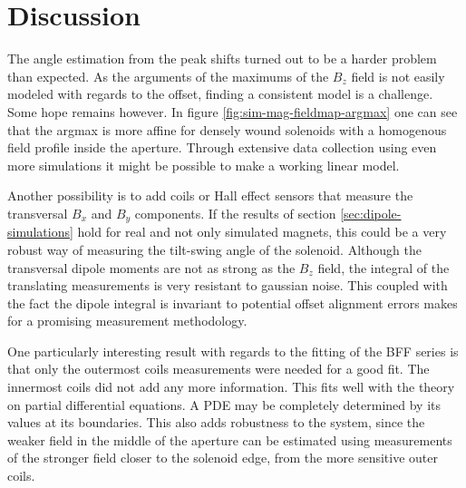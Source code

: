 \chapter{Discussion}
The angle estimation from the peak shifts turned out to be 
a harder problem than expected. As the arguments of the maximums of the
$B_z$ field is not easily modeled with regards to the offset, finding
a consistent model is a challenge. Some hope remains however. In figure
\ref{fig:sim-mag-fieldmap-argmax} one can see that the argmax is more affine
for densely wound solenoids with a homogenous field profile inside the aperture.
Through extensive data collection using even more simulations it might be
possible to make a working linear model.

Another possibility is to add coils or Hall effect sensors that measure
the transversal $B_x$ and $B_y$ components. If the results of section 
\ref{sec:dipole-simulations} hold for real and not only simulated magnets,
this could be a very robust way of measuring the tilt-swing angle of the
solenoid. Although the transversal dipole moments are not as strong as
the $B_z$ field, the integral of the translating measurements is very
resistant to gaussian noise. This coupled with the fact the dipole
integral is invariant to potential offset alignment errors makes for
a promising measurement methodology.

One particularly interesting result with regards to the fitting
of the BFF series is that only the outermost coils measurements
were needed for a good fit. The innermost coils did not add any
more information. This fits well with the theory on partial
differential equations. A PDE may be completely determined
by its values at its boundaries. This also adds robustness to the system,
since the weaker field in the middle of the aperture can be estimated
using measurements of the stronger field closer to the solenoid edge,
from the more sensitive outer coils.